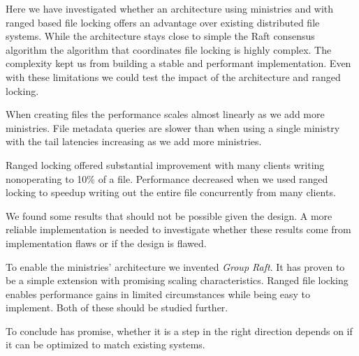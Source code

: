 Here we have investigated whether an architecture using ministries and with ranged based file locking offers an advantage over existing distributed file systems. While the architecture stays close to simple the Raft consensus algorithm the algorithm that coordinates file locking is highly complex. The complexity kept us from building a stable and performant implementation. Even with these limitations we could test the impact of the architecture and ranged locking.

When creating files the performance scales almost linearly as we add more ministries. File metadata queries are slower than when using a single ministry with the tail latencies increasing as we add more ministries.

Ranged locking offered substantial improvement with many clients writing nonoperating to 10\% of a file. Performance decreased when we used ranged locking to speedup writing out the entire file concurrently from many clients. 

We found some results that should not be possible given the design. A more reliable implementation is needed to investigate whether these results come from implementation flaws or if the design is flawed. 

To enable the ministries' architecture we invented \textit{Group Raft}. It has proven to be a simple extension with promising scaling characteristics. Ranged file locking enables performance gains in limited circumstances while being easy to implement. Both of these should be studied further. 

To conclude \name{} has promise, whether it is a step in the right direction depends on if it can be optimized to match existing systems.

